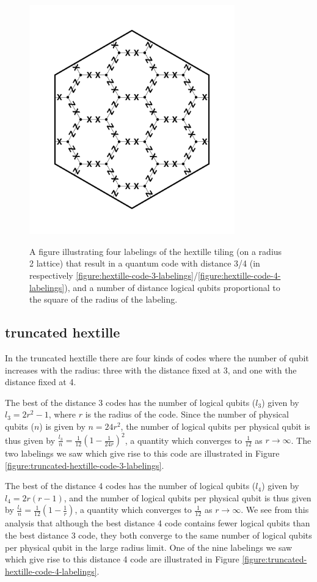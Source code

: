 \documentclass[12pt]{amsbook}
\theoremstyle{plain}
\theoremstyle{definition}
\theoremstyle{remark}
\newcommand{\paren}[1]{\left(#1\right)}
\begin{document}
\begin{figure}
{\includegraphics[width=3.5in]{images/hextille-code-4-labeling-2} %
}
\caption{
\label{figure:hextille-code-labelings}
A figure illustrating four labelings of the hextille tiling (on a radius 2 lattice) that result in a quantum code with distance 3/4 (in respectively \ref{figure:hextille-code-3-labelings}/\ref{figure:hextille-code-4-labelings}), and a number of distance logical qubits proportional to the square of the radius of the labeling.
}
\end{figure}
\subsection{truncated hextille}

In the truncated hextille there are four kinds of codes where the number of qubit increases with the radius:  three with the distance fixed at 3, and one with the distance fixed at 4.

The best of the distance 3 codes has the number of logical qubits ($l_3$) given by $l_3=2r^2-1$, where $r$ is the radius of the code.  Since the number of physical qubits ($n$) is given by $n=24r^2$, the number of logical qubits per physical qubit is thus given by $\frac{l_3}{n}=\frac{1}{12}\paren{1-\frac{1}{24r}}^2$, a quantity which converges to $\frac{1}{12}$ as $r\to\infty$.  The two labelings we saw which give rise to this code are illustrated in Figure \ref{figure:truncated-hextille-code-3-labelings}.

The best of the distance 4 codes has the number of logical qubits ($l_4$) given by $l_4=2r(r-1)$, and the number of logical qubits per physical qubit is thus given by $\frac{l_4}{n}=\frac{1}{12}\paren{1-\frac{1}{r}}$, a quantity which converges to $\frac{1}{12}$ as $r\to\infty$.  We see from this analysis that although the best distance 4 code contains fewer logical qubits than the best distance 3 code, they both converge to the same number of logical qubits per physical qubit in the large radius limit.  One of the nine labelings we saw which give rise to this distance 4 code are illustrated in Figure \ref{figure:truncated-hextille-code-4-labelings}.
\end{document}
